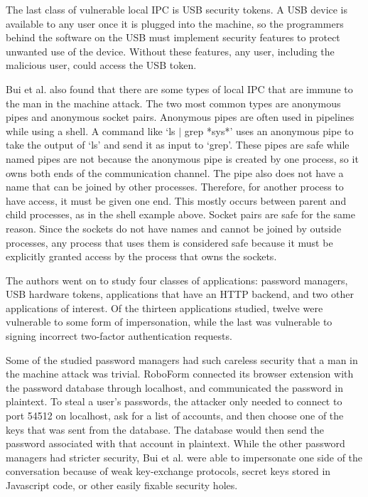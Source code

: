 The last class of vulnerable local IPC is USB security tokens.  A USB device is available to any user once it is plugged into the machine, so the programmers behind the software on the USB must implement security features to protect unwanted use of the device.  Without these features, any user, including the malicious user, could access the USB token.

Bui et al. also found that there are some types of local IPC that are immune to the man in the machine attack.  The two most common types are anonymous pipes and anonymous socket pairs.  Anonymous pipes are often used in pipelines while using a shell.  A command like `ls $|$ grep *sys*' uses an anonymous pipe to take the output of `ls' and send it as input to `grep'.  These pipes are safe while named pipes are not because the anonymous pipe is created by one process, so it owns both ends of the communication channel.  The pipe also does not have a name that can be joined by other processes.  Therefore, for another process to have access, it must be given one end.  This mostly occurs between parent and child processes, as in the shell example above.  Socket pairs are safe for the same reason.  Since the sockets do not have names and cannot be joined by outside processes, any process that uses them is considered safe because it must be explicitly granted access by the process that owns the sockets.

The authors went on to study four classes of applications: password managers, USB hardware tokens, applications that have an HTTP backend, and two other applications of interest.  Of the thirteen applications studied, twelve were vulnerable to some form of impersonation, while the last was vulnerable to signing incorrect two-factor authentication requests.

Some of the studied password managers had such careless security that a man in the machine attack was trivial.  RoboForm connected its browser extension with the password database through localhost, and communicated the password in plaintext.  To steal a user's passwords, the attacker only needed to connect to port 54512 on localhost, ask for a list of accounts, and then choose one of the keys that was sent from the database.  The database would then send the password associated with that account in plaintext.  While the other password managers had stricter security, Bui et al. were able to impersonate one side of the conversation because of weak key-exchange protocols, secret keys stored in Javascript code, or other easily fixable security holes.

